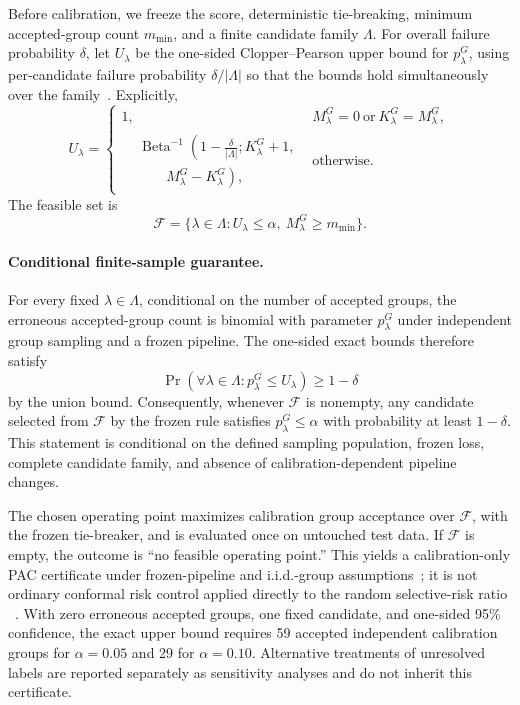 Before calibration, we freeze the score, deterministic tie-breaking, minimum
accepted-group count $m_{\min}$, and a finite candidate family $\Lambda$. For
overall failure probability $\delta$, let $U_\lambda$ be the one-sided
Clopper--Pearson upper bound for $p_\lambda^G$, using per-candidate failure
probability $\delta/|\Lambda|$ so that the bounds hold simultaneously over the
family~\cite{clopper1934use}. Explicitly,
\begin{equation}
    U_\lambda=
    \begin{cases}
        1, & M_\lambda^G=0\ \text{or}\ K_\lambda^G=M_\lambda^G,\\
        \begin{aligned}
        &\operatorname{Beta}^{-1}\!\left(
        1-\frac{\delta}{|\Lambda|}; K_\lambda^G+1,\right.\\[-1mm]
        &\qquad\left.M_\lambda^G-K_\lambda^G\right),
        \end{aligned} & \text{otherwise}.
    \end{cases}
\end{equation}
The feasible set is
\begin{equation}
    \mathcal{F}=\{\lambda\in\Lambda:
    U_\lambda\leq\alpha,\ M_\lambda^G\geq m_{\min}\}.
\end{equation}

\paragraph{Conditional finite-sample guarantee.}
For every fixed $\lambda\in\Lambda$, conditional on the number of accepted
groups, the erroneous accepted-group count is binomial with parameter
$p_\lambda^G$ under independent group sampling and a frozen pipeline. The
one-sided exact bounds therefore satisfy
\begin{equation}
    \Pr\!\left(\forall\lambda\in\Lambda:
    p_\lambda^G\leq U_\lambda\right)\geq 1-\delta
\end{equation}
by the union bound. Consequently, whenever $\mathcal{F}$ is nonempty, any
candidate selected from $\mathcal{F}$ by the frozen rule satisfies
$p_\lambda^G\leq\alpha$ with probability at least $1-\delta$. This statement
is conditional on the defined sampling population, frozen loss, complete
candidate family, and absence of calibration-dependent pipeline changes.

The chosen operating point maximizes calibration group acceptance over
$\mathcal{F}$, with the frozen tie-breaker, and is evaluated once on untouched
test data. If $\mathcal{F}$ is empty, the outcome is ``no feasible operating
point.'' This yields a calibration-only PAC certificate under frozen-pipeline
and i.i.d.-group assumptions~\cite{xu2025scrc}; it is not ordinary conformal
risk control applied directly to the random selective-risk ratio
~\cite{angelopoulos2024crc}. With zero erroneous accepted groups, one fixed
candidate, and one-sided 95\% confidence, the exact upper bound requires 59
accepted independent calibration groups for $\alpha=0.05$ and 29 for
$\alpha=0.10$.
Alternative treatments of unresolved labels are reported separately as
sensitivity analyses and do not inherit this certificate.

